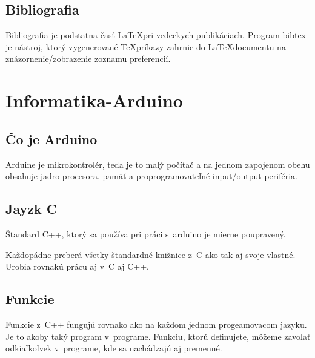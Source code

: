 \documentclass[a4paper, 11pt]{article}
\begin{document}
\subsection{Bibliografia}
Bibliografia je podstatna časť \LaTeX pri vedeckych publikáciach. \cite{kopka1995guide}
Program bibtex je nástroj, ktorý vygenerované \TeX príkazy zahrnie do \LaTeX documentu na
znázornenie/zobrazenie zoznamu preferencií. \cite{thummala2007bibliography}

\section{Informatika-Arduino}
\subsection{Čo je Arduino}
Arduine je mikrokontrolér, teda je to malý počítač a na jednom zapojenom obehu obsahuje jadro procesora, pamäť a proprogramovateľné input/output periféria. \cite{smith2011introduction}

\subsection{Jayzk C}
Štandard C++, ktorý sa používa pri práci s~arduino je mierne poupravený. \par Každopádne preberá
všetky štandardné knižnice z~C ako tak aj svoje vlastné. Urobia rovnakú prácu aj v~C aj C++.
\cite{eckel2000myslime} 

\subsection{Funkcie}
Funkcie z~C++ fungujú rovnako ako na každom jednom progeamovacom jazyku. Je to akoby taký program v~programe. Funkciu, ktorú definujete, môžeme zavolať odkiaľkoľvek v~programe, kde sa nachádzajú aj premenné. \cite{monk2016programming}
	
	\newpage
	
	
\end{document}
